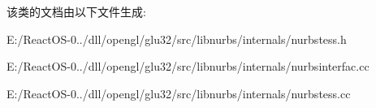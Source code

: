 该类的文档由以下文件生成\+:\begin{DoxyCompactItemize}
\item 
E\+:/\+React\+O\+S-\/0../dll/opengl/glu32/src/libnurbs/internals/nurbstess.\+h\item 
E\+:/\+React\+O\+S-\/0../dll/opengl/glu32/src/libnurbs/internals/nurbsinterfac.\+cc\item 
E\+:/\+React\+O\+S-\/0../dll/opengl/glu32/src/libnurbs/internals/nurbstess.\+cc\end{DoxyCompactItemize}
